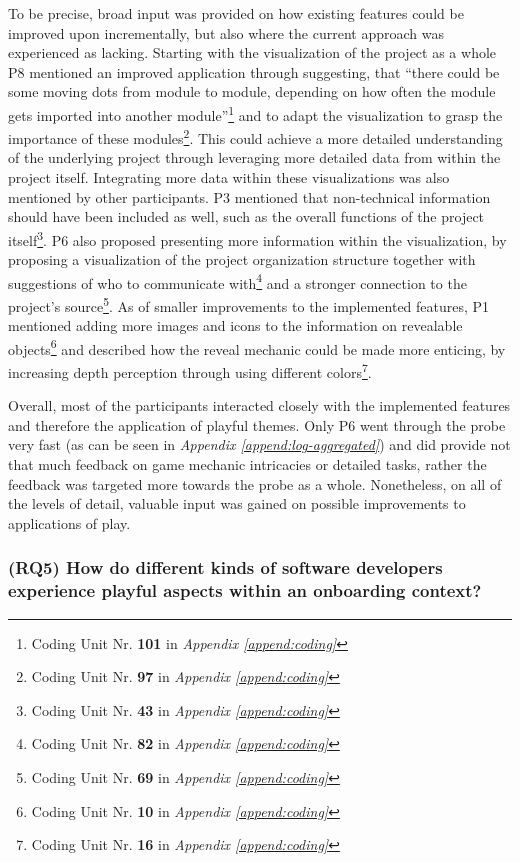 To be precise, broad input was provided on how existing features could be improved upon incrementally, but also where the current approach was experienced as lacking. Starting with the visualization of the project as a whole P8 mentioned an improved application through suggesting, that \enquote{there could be some moving dots from module to module, depending on how often the module gets imported into another module}\footnote{Coding Unit Nr. \textbf{101} in \textit{Appendix \ref{append:coding}}} and to adapt the visualization to grasp the importance of these modules\footnote{Coding Unit Nr. \textbf{97} in \textit{Appendix \ref{append:coding}}}. This could achieve a more detailed understanding of the underlying project through leveraging more detailed data from within the project itself. Integrating more data within these visualizations was also mentioned by other participants. P3 mentioned that non-technical information should have been included as well, such as the overall functions of the project itself\footnote{Coding Unit Nr. \textbf{43} in \textit{Appendix \ref{append:coding}}}. P6 also proposed presenting more information within the visualization, by proposing a visualization of the project organization structure together with suggestions of who to communicate with\footnote{Coding Unit Nr. \textbf{82} in \textit{Appendix \ref{append:coding}}} and a stronger connection to the project's source\footnote{Coding Unit Nr. \textbf{69} in \textit{Appendix \ref{append:coding}}}. As of smaller improvements to the implemented features, P1 mentioned adding more images and icons to the information on revealable objects\footnote{Coding Unit Nr. \textbf{10} in \textit{Appendix \ref{append:coding}}} and described how the reveal mechanic could be made more enticing, by increasing depth perception through using different colors\footnote{Coding Unit Nr. \textbf{16} in \textit{Appendix \ref{append:coding}}}.

Overall, most of the participants interacted closely with the implemented features and therefore the application of playful themes. Only P6 went through the probe very fast (as can be seen in \textit{Appendix \ref{append:log-aggregated}}) and did provide not that much feedback on game mechanic intricacies or detailed tasks, rather the feedback was targeted more towards the probe as a whole. Nonetheless, on all of the levels of detail, valuable input was gained on possible improvements to applications of play.

\subsubsection*{(RQ5) How do different kinds of software developers experience playful aspects within an onboarding context?}

